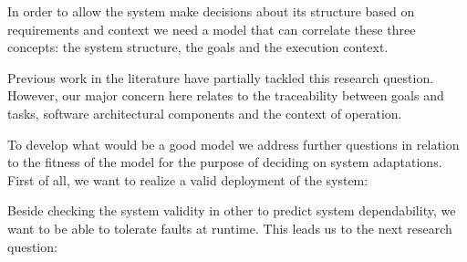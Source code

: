 

In order to allow the system make decisions about its structure based on requirements and context we need a model that can correlate these three concepts: the system structure, the goals and the execution context.



\setlength{\fboxsep}{10pt}
\noindent{}\bigskip
Previous work in the literature \cite{pessoa_dependable_2015} have partially tackled this research question. However, our major concern here relates to the traceability between goals and tasks, software architectural components and the context of operation.

To develop what would be a good model we address further questions in relation to the fitness of the model for the purpose of deciding on system adaptations. First of all, we want to realize a valid deployment of the system:

\setlength{\fboxsep}{10pt}
\noindent{}\bigskip

Beside checking the system validity in other to predict system dependability, we want to be able to tolerate faults at runtime. This leads us to the next research question:

\setlength{\fboxsep}{10pt}
\noindent{}\bigskip

